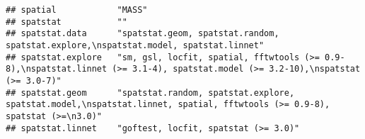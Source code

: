 \documentclass[
]{article}
\begin{document}
\begin{verbatim}
## spatial            "MASS"                                                                                                                                                                                                                                                                                                                                                                                                                                                                            
## spatstat           ""                                                                                                                                                                                                                                                                                                                                                                                                                                                                                
## spatstat.data      "spatstat.geom, spatstat.random, spatstat.explore,\nspatstat.model, spatstat.linnet"                                                                                                                                                                                                                                                                                                                                                                                              
## spatstat.explore   "sm, gsl, locfit, spatial, fftwtools (>= 0.9-8),\nspatstat.linnet (>= 3.1-4), spatstat.model (>= 3.2-10),\nspatstat (>= 3.0-7)"                                                                                                                                                                                                                                                                                                                                                   
## spatstat.geom      "spatstat.random, spatstat.explore, spatstat.model,\nspatstat.linnet, spatial, fftwtools (>= 0.9-8), spatstat (>=\n3.0)"                                                                                                                                                                                                                                                                                                                                                          
## spatstat.linnet    "goftest, locfit, spatstat (>= 3.0)"                                                                                                                                                                                                                                                                                                                                                                                                                                              

\end{verbatim}
\end{document}

